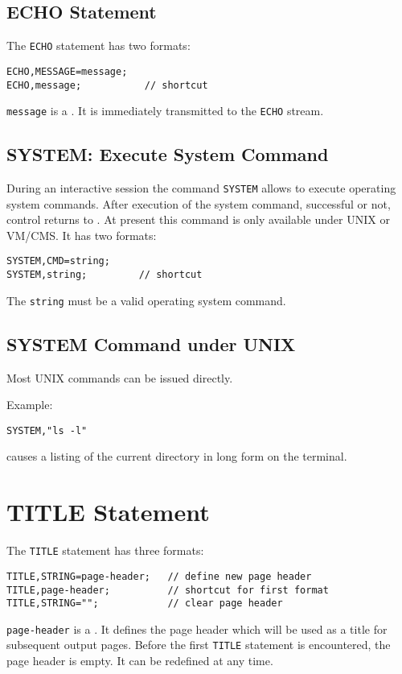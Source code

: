 \subsection{ECHO Statement}
\label{sec:echo}
The \texttt{ECHO} statement has two formats:
\begin{verbatim}
ECHO,MESSAGE=message;
ECHO,message;           // shortcut
\end{verbatim}
\texttt{message} is a .
It is immediately transmitted to the \texttt{ECHO} stream.

\subsection{SYSTEM: Execute System Command}
\label{sec:system}
During an interactive \opal session the command \texttt{SYSTEM}
allows to execute operating system commands.
After execution of the system command, successful or not,
control returns to \opal.
At present this command is only available under UNIX or VM/CMS.
It has two formats:
\begin{verbatim}
SYSTEM,CMD=string;
SYSTEM,string;         // shortcut
\end{verbatim}
The  \texttt{string} must be a valid operating
system command. 

\subsection{SYSTEM Command under UNIX}
Most UNIX commands can be issued directly.

\noindent Example:
\begin{verbatim}
SYSTEM,"ls -l"
\end{verbatim}
causes a listing of the current directory in long form on the terminal.

\section{TITLE Statement}
\label{sec:title}
The \texttt{TITLE} statement has three formats:
\begin{verbatim}
TITLE,STRING=page-header;   // define new page header
TITLE,page-header;          // shortcut for first format
TITLE,STRING="";            // clear page header
\end{verbatim}
\texttt{page-header} is a .
It defines the page header which will be used as a title for
subsequent output pages. 
Before the first \texttt{TITLE} statement is encountered, 
the page header is empty.
It can be redefined at any time.

